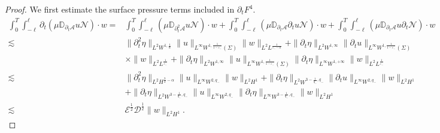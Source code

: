 \documentclass[letterpaper,reqno,10pt,twoside]{amsart}
\theoremstyle{definition}
\theoremstyle{remark}
\def\p{\partial}
\begin{document}
\begin{proof}
			We first estimate the surface pressure terms included in $\p_{t}F^{4}$.
			\[
			\begin{aligned}
				\int_{0}^{T}\int_{-\ell}^{\ell}\p_{t}(\mu \mathbb{D}_{\p_{t}\mathcal{A}}u\mathcal{N})\cdot w=& \int_{0}^{T}\int_{-\ell}^{\ell}(\mu \mathbb{D}_{\p_{t}^{2}\mathcal{A}}u\mathcal{N})\cdot w+ \int_{0}^{T}\int_{-\ell}^{\ell}(\mu \mathbb{D}_{\p_{t}\mathcal{A}}\p_{t}u\mathcal{N})\cdot w+ \int_{0}^{T}\int_{-\ell}^{\ell}(\mu \mathbb{D}_{\p_{t}\mathcal{A}}u\p_{t}\mathcal{N})\cdot w\\
				\lesssim& \|\p_{t}^{2}\eta\|_{L^{2}W^{1,\frac{1}{\alpha}}}\|u\|_{L^{\infty}W^{1,\frac{1}{1-\varepsilon_{-}}}(\Sigma)}\| w\|_{L^{2}L^{\frac{1}{\varepsilon_{-}-\alpha}}}+\|\p_{t}\eta\|_{L^{2}W^{1,\infty}}\|\p_{t}u\|_{L^{\infty}W^{1,\frac{1}{1-\varepsilon_{-}}}(\Sigma)}\\
				&\times\| w\|_{L^{2}L^{\frac{1}{\varepsilon_{-}}}}+\|\p_{t}\eta\|_{L^{2}W^{1,\infty}}\|u\|_{L^{\infty}W^{1,\frac{1}{1-\varepsilon_{-}}}(\Sigma)}\|\p_{t}\eta\|_{L^{\infty}W^{1,+\infty}}\| w\|_{L^{2}L^{\frac{1}{\varepsilon_{-}}}}\\
				\lesssim& \|\p_{t}^{2}\eta\|_{L^{2}H^{\frac{3}{2}-\alpha}}\|u\|_{L^{\infty}W^{2,q_{-}}}\| w\|_{L^{2}H^{1}}+\|\p_{t}\eta\|_{L^{2}W^{3-\frac{1}{q_{-}},q_{-}}}\|\p_{t}u\|_{L^{\infty}W^{2,q_{-}}}\| w\|_{L^{2}H^{1}}\\
				&+\|\p_{t}\eta\|_{L^{2}W^{3-\frac{1}{q_{-}},q_{-}}}\|u\|_{L^{\infty}W^{2,q_{-}}}\|\p_{t}\eta\|_{L^{\infty}W^{3-\frac{1}{q_{-}},q_{-}}}\| w\|_{L^{2}H^{1}}\\
				\lesssim&\mathscr{E}^{\frac{1}{2}}\mathscr{D}^{\frac{1}{2}}\|w\|_{L^{2}H^{1}}.
			\end{aligned}
			\]
			

\end{proof}
\end{document}
